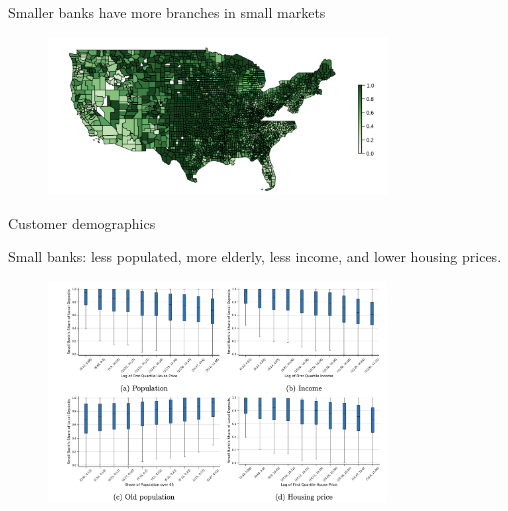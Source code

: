 \documentclass[notes,10pt, aspectratio=169]{beamer}
\newenvironment{wideitemize}{\itemize\addtolength{\itemsep}{10pt}}{\enditemize}
\begin{document}
\begin{frame}{Smaller banks have more branches in small markets}

    
    
    \begin{figure}
    \centering
    \includegraphics[width=0.8\textwidth]{imgs/fig4.png}
    \end{figure}
    
    \end{frame}

\begin{frame}{Customer demographics}
    
        \begin{wideitemize}
            \item Small banks: less populated, more elderly, less income, and lower housing prices.
    \end{wideitemize}
    
    \begin{figure}
    \centering
    \includegraphics[width=0.8\textwidth]{imgs/fig5.png}
    \end{figure}
    
    \end{frame}
\end{document}
